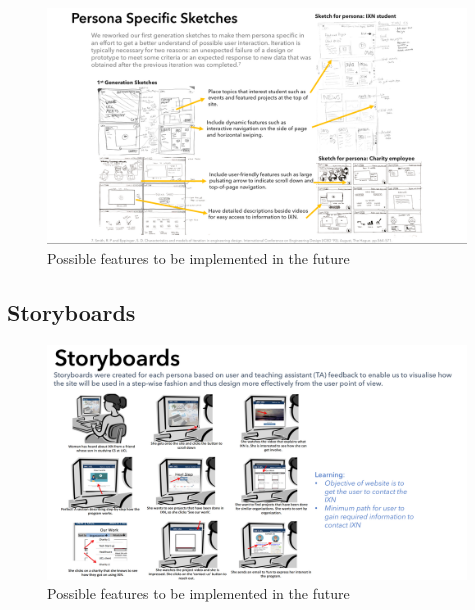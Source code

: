 \documentclass[fontsize=10pt]{extarticle}
\numberwithin{figure}{section} %
\begin{document}
\begin{landscape}
 \begin{figure}[H]
      \centering
      \includegraphics[trim = 0 0 0 0, clip, width=0.99\textwidth]{app3.png}
      \caption{Possible features to be implemented in the future}
 \end{figure}
  \end{landscape}

\newpage

\hypertarget{storyboards}{%
\subsection{Storyboards}\label{storyboards}}

\begin{landscape}
 \begin{figure}[H]
      \centering
      \includegraphics[trim = 0 0 0 0, clip, width=0.99\textwidth]{app2.png}
      \caption{Possible features to be implemented in the future}
 \end{figure}
  \end{landscape}
\end{document}
